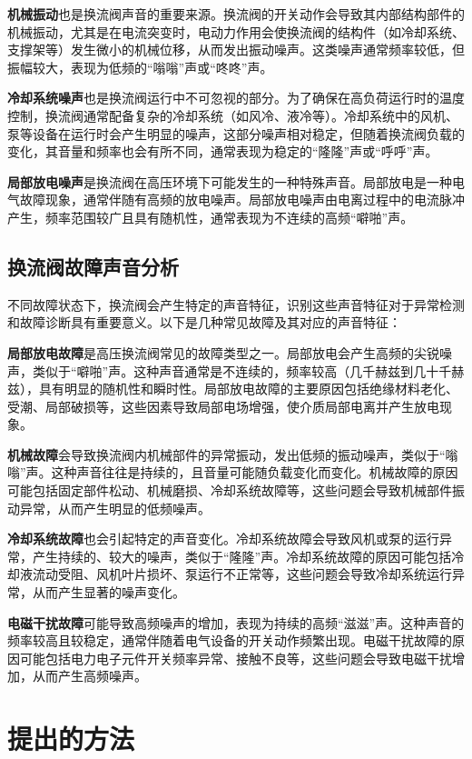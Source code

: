 \documentclass{article}
\begin{document}
\textbf{机械振动}也是换流阀声音的重要来源。换流阀的开关动作会导致其内部结构部件的机械振动，尤其是在电流突变时，电动力作用会使换流阀的结构件（如冷却系统、支撑架等）发生微小的机械位移，从而发出振动噪声。这类噪声通常频率较低，但振幅较大，表现为低频的“嗡嗡”声或“咚咚”声。

\textbf{冷却系统噪声}也是换流阀运行中不可忽视的部分。为了确保在高负荷运行时的温度控制，换流阀通常配备复杂的冷却系统（如风冷、液冷等）。冷却系统中的风机、泵等设备在运行时会产生明显的噪声，这部分噪声相对稳定，但随着换流阀负载的变化，其音量和频率也会有所不同，通常表现为稳定的“隆隆”声或“呼呼”声。

\textbf{局部放电噪声}是换流阀在高压环境下可能发生的一种特殊声音。局部放电是一种电气故障现象，通常伴随有高频的放电噪声。局部放电噪声由电离过程中的电流脉冲产生，频率范围较广且具有随机性，通常表现为不连续的高频“噼啪”声。

\subsection{换流阀故障声音分析}

不同故障状态下，换流阀会产生特定的声音特征，识别这些声音特征对于异常检测和故障诊断具有重要意义。以下是几种常见故障及其对应的声音特征：

\textbf{局部放电故障}是高压换流阀常见的故障类型之一。局部放电会产生高频的尖锐噪声，类似于“噼啪”声。这种声音通常是不连续的，频率较高（几千赫兹到几十千赫兹），具有明显的随机性和瞬时性。局部放电故障的主要原因包括绝缘材料老化、受潮、局部破损等，这些因素导致局部电场增强，使介质局部电离并产生放电现象。

\textbf{机械故障}会导致换流阀内机械部件的异常振动，发出低频的振动噪声，类似于“嗡嗡”声。这种声音往往是持续的，且音量可能随负载变化而变化。机械故障的原因可能包括固定部件松动、机械磨损、冷却系统故障等，这些问题会导致机械部件振动异常，从而产生明显的低频噪声。

\textbf{冷却系统故障}也会引起特定的声音变化。冷却系统故障会导致风机或泵的运行异常，产生持续的、较大的噪声，类似于“隆隆”声。冷却系统故障的原因可能包括冷却液流动受阻、风机叶片损坏、泵运行不正常等，这些问题会导致冷却系统运行异常，从而产生显著的噪声变化。

\textbf{电磁干扰故障}可能导致高频噪声的增加，表现为持续的高频“滋滋”声。这种声音的频率较高且较稳定，通常伴随着电气设备的开关动作频繁出现。电磁干扰故障的原因可能包括电力电子元件开关频率异常、接触不良等，这些问题会导致电磁干扰增加，从而产生高频噪声。

\section{提出的方法}
\end{document}
